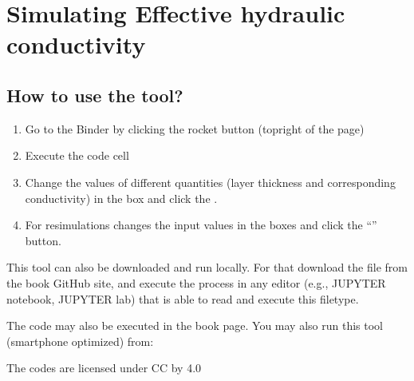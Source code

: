 \documentclass[letterpaper,10pt,english]{sphinxmanual}
\begin{document}
\section{Simulating Effective hydraulic conductivity}
\label{\detokenize{contents/tools/effective_K:simulating-effective-hydraulic-conductivity}}\label{\detokenize{contents/tools/effective_K::doc}}

\subsection{How to use the tool?}
\label{\detokenize{contents/tools/effective_K:how-to-use-the-tool}}\begin{enumerate}
%
\item {} 
Go to the Binder by clicking the rocket button (top\sphinxhyphen{}right of the page)

\item {} 
Execute the code cell

\item {} 
Change the values of different quantities (layer thickness and corresponding conductivity) in the box and click the .

\item {} 
For re\sphinxhyphen{}simulations \sphinxhyphen{} changes the input values in the boxes and click the “” button.

\end{enumerate}

This tool can also be downloaded and run locally. For that download the  file from the book GitHub site, and execute the process in any editor (e.g., JUPYTER notebook, JUPYTER lab) that is able to read and execute this file\sphinxhyphen{}type.

The code may also be executed in the book page. You may also run this tool (smartphone optimized) from: 

The codes are licensed under CC by 4.0 
\end{document}
